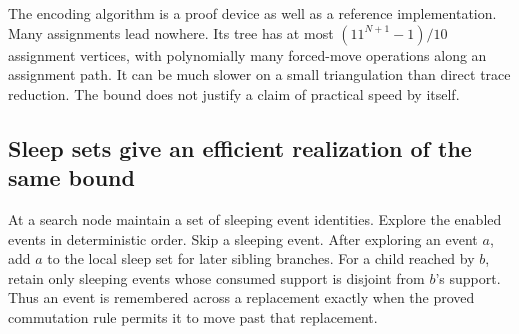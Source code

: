 \begin{remark}
The encoding algorithm is a proof device as well as a reference implementation.
Many assignments lead nowhere. Its tree has at most
$(11^{N+1}-1)/10$ assignment vertices, with polynomially many forced-move
operations along an assignment path. It can be much slower on a small
triangulation than direct trace reduction. The bound does not justify a
claim of practical speed by itself.
\end{remark}

\subsection{Sleep sets give an efficient realization of the same bound}

At a search node maintain a set of sleeping event identities. Explore the
enabled events in deterministic order. Skip a sleeping event. After exploring
an event $a$, add $a$ to the local sleep set for later sibling branches.
For a child reached by $b$, retain only sleeping events whose consumed support
is disjoint from $b$'s support. Thus an event is remembered across a replacement
exactly when the proved commutation rule permits it to move past that replacement.


